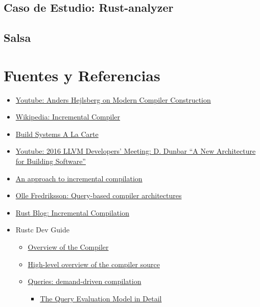 \documentclass[10pt, a4paper]{report}
\begin{document}
\subsection*{Caso de Estudio: Rust-analyzer}

\subsection*{Salsa}

\section*{Fuentes y Referencias}

\begin{itemize}[noitemsep]
\item \href{https://www.youtube.com/watch?v=wSdV1M7n4gQ}{Youtube: Anders Hejlsberg on Modern Compiler Construction}
\item \href{https://en.wikipedia.org/wiki/Incremental_compiler}{Wikipedia: Incremental Compiler}
\item \href{https://www.microsoft.com/en-us/research/publication/build-systems-la-carte/}{Build Systems A La Carte}
\item \href{https://www.youtube.com/watch?v=b_T-eCToX1I}{Youtube: 2016 LLVM Developers’ Meeting: D. Dunbar “A New Architecture for Building Software”}
\item \href{https://dl.acm.org/doi/10.1145/502949.502889}{An approach to incremental compilation}
\item \href{https://ollef.github.io/blog/posts/query-based-compilers.html}{Olle Fredriksson: Query-based compiler architectures}
\item \href{https://blog.rust-lang.org/2016/09/08/incremental.html}{Rust Blog: Incremental Compilation}
\item Rustc Dev Guide
	\begin{itemize}[noitemsep]
	\item \href{https://rustc-dev-guide.rust-lang.org/overview.html}{Overview of the Compiler}
	\item \href{https://rustc-dev-guide.rust-lang.org/compiler-src.html}{High-level overview of the compiler source}
	\item \href{https://rustc-dev-guide.rust-lang.org/query.html}{Queries: demand-driven compilation}
		\begin{itemize}[noitemsep]
		\item \href{https://rustc-dev-guide.rust-lang.org/queries/query-evaluation-model-in-detail.html}{The Query Evaluation Model in Detail}

\end{itemize}
\end{itemize}
\end{itemize}
\end{document}
